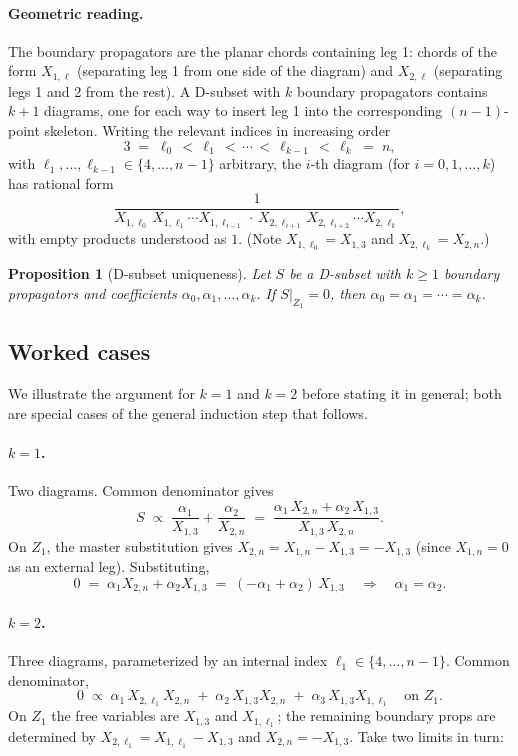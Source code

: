 \documentclass[11pt]{article}
\newtheorem{proposition}[theorem]{Proposition}
\theoremstyle{definition}
\begin{document}
\paragraph{Geometric reading.} The boundary propagators are the planar chords containing leg 1: chords of the form $X_{1,\ell}$ (separating leg 1 from one side of the diagram) and $X_{2,\ell}$ (separating legs 1 and 2 from the rest). A D-subset with $k$ boundary propagators contains $k+1$ diagrams, one for each way to insert leg 1 into the corresponding $(n-1)$-point skeleton. Writing the relevant indices in increasing order
\[
3 \;=\; \ell_0 \,<\, \ell_1 \,<\, \cdots \,<\, \ell_{k-1} \,<\, \ell_k \;=\; n,
\]
with $\ell_1, \dots, \ell_{k-1} \in \{4, \dots, n-1\}$ arbitrary, the $i$-th diagram (for $i = 0, 1, \dots, k$) has rational form
\[
\frac{1}{X_{1,\ell_0}\,X_{1,\ell_1}\cdots X_{1,\ell_{i-1}}\,\cdot\,X_{2,\ell_{i+1}}\,X_{2,\ell_{i+2}}\cdots X_{2,\ell_k}},
\]
with empty products understood as $1$. (Note $X_{1,\ell_0} = X_{1,3}$ and $X_{2,\ell_k} = X_{2,n}$.)

\begin{proposition}[D-subset uniqueness]\label{prop:Dsubset}
Let $S$ be a D-subset with $k \geq 1$ boundary propagators and coefficients $\alpha_0, \alpha_1, \dots, \alpha_k$. If $S|_{Z_1} = 0$, then $\alpha_0 = \alpha_1 = \cdots = \alpha_k$.
\end{proposition}

\subsection{Worked cases}

We illustrate the argument for $k=1$ and $k=2$ before stating it in general; both are special cases of the general induction step that follows.

\paragraph{$k = 1$.} Two diagrams. Common denominator gives
\[
S \;\propto\; \frac{\alpha_1}{X_{1,3}} + \frac{\alpha_2}{X_{2,n}} \;=\; \frac{\alpha_1\,X_{2,n} + \alpha_2\,X_{1,3}}{X_{1,3}\,X_{2,n}}.
\]
On $Z_1$, the master substitution gives $X_{2,n} = X_{1,n} - X_{1,3} = -X_{1,3}$ (since $X_{1,n} = 0$ as an external leg). Substituting,
\[
0 \;=\; \alpha_1 X_{2,n} + \alpha_2 X_{1,3} \;=\; (-\alpha_1 + \alpha_2)\,X_{1,3} \quad\Longrightarrow\quad \alpha_1 = \alpha_2.
\]

\paragraph{$k = 2$.} Three diagrams, parameterized by an internal index $\ell_1 \in \{4, \dots, n-1\}$. Common denominator,
\begin{equation}\label{eq:k2num}
0 \;\propto\; \alpha_1\,X_{2,\ell_1}X_{2,n} \;+\; \alpha_2\,X_{1,3}X_{2,n} \;+\; \alpha_3\,X_{1,3}X_{1,\ell_1} \quad\text{on } Z_1.
\end{equation}
On $Z_1$ the free variables are $X_{1,3}$ and $X_{1,\ell_1}$; the remaining boundary props are determined by $X_{2,\ell_1} = X_{1,\ell_1} - X_{1,3}$ and $X_{2,n} = -X_{1,3}$. Take two limits in turn:
\end{document}
